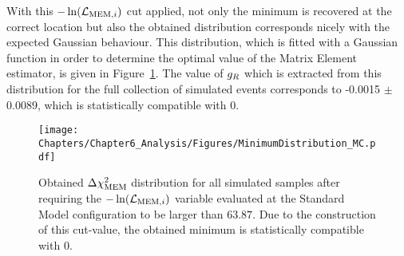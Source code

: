 With this $-\ln(\mathcal{L}_{\textrm{MEM}, i})$ cut applied, not only the minimum is recovered at the correct location but also the obtained distribution corresponds nicely with the expected Gaussian behaviour.
This distribution, which is fitted with a Gaussian function in order to determine the optimal value of the Matrix Element estimator, is given in Figure~\ref{fig::MinNominal}.
The value of $g_{R}$ which is extracted from this distribution for the full collection of simulated events corresponds to -0.0015 $\pm$ 0.0089, which is statistically compatible with $0$.
\\
\begin{figure}[h!t]
 \centering
 \texttt{[image: Chapters/Chapter6\_Analysis/Figures/MinimumDistribution\_MC.pdf]}
 \caption{Obtained $\Delta \chi^{2}_{\textrm{MEM}}$ distribution for all simulated samples after requiring the $-\ln(\mathcal{L}_{\textrm{MEM}, i})$ variable evaluated at the Standard Model configuration to be larger than $63.87$. Due to the construction of this cut-value, the obtained minimum is statistically compatible with $0$.} \label{fig::MinNominal}
\end{figure}




